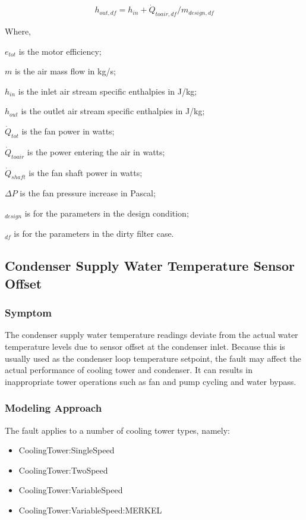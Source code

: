 \begin{equation}
h_{out,df} = h_{in} + \dot{Q}_{toair,df} / m_{design,df}
\end{equation}

Where,

\(e_{tot}\) is the motor efficiency;

\(m\) is the air mass flow in kg/s;

\(h_{in}\) is the inlet air stream specific enthalpies in J/kg;

\(h_{out}\) is the outlet air stream specific enthalpies in J/kg;

\(\dot{Q}_{tot}\) is the fan power in watts;

\(\dot{Q}_{toair}\) is the power entering the air in watts;

\(\dot{Q}_{shaft}\) is the fan shaft power in watts;

\(\Delta P\) is the fan pressure increase in Pascal;

\(_{design}\) is for the parameters in the design condition;

\(_{df}\) is for the parameters in the dirty filter case.

\subsection{Condenser Supply Water Temperature Sensor Offset}\label{condenser-supply-water-temperature-sensor-offset}

\subsubsection{Symptom}

The condenser supply water temperature readings deviate from the actual water temperature levels due to sensor offset at the condenser inlet. Because this is usually used as the condenser loop temperature setpoint, the fault may affect the actual performance of cooling tower and condenser. It can results in inappropriate tower operations such as fan and pump cycling and water bypass. 

\subsubsection{Modeling Approach}

The fault applies to a number of cooling tower types, namely:

\begin{itemize}
\tightlist
\item
  CoolingTower:SingleSpeed
\item
  CoolingTower:TwoSpeed
\item
  CoolingTower:VariableSpeed
\item
  CoolingTower:VariableSpeed:MERKEL
\end{itemize}


